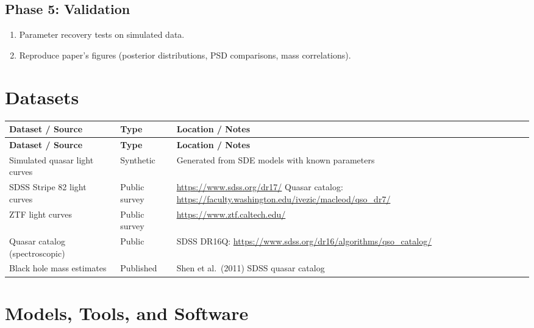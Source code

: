 \documentclass[11pt,a4paper]{article}
\begin{document}
\subsection{Phase 5: Validation}
\begin{enumerate}[label=\textbf{5.\arabic*}]
  \item Parameter recovery tests on simulated data.
  \item Reproduce paper's figures (posterior distributions, PSD comparisons, mass correlations).
\end{enumerate}

\section{Datasets}

\begin{longtable}{p{4.5cm} p{3.5cm} p{6cm}}
\toprule
\textbf{Dataset / Source} & \textbf{Type} & \textbf{Location / Notes} \\
\midrule
\endfirsthead
\toprule
\textbf{Dataset / Source} & \textbf{Type} & \textbf{Location / Notes} \\
\midrule
\endhead
Simulated quasar light curves & Synthetic & Generated from SDE models with known parameters \\
\midrule
SDSS Stripe 82 light curves & Public survey & \url{https://www.sdss.org/dr17/} \newline Quasar catalog: \url{https://faculty.washington.edu/ivezic/macleod/qso_dr7/} \\
\midrule
ZTF light curves & Public survey & \url{https://www.ztf.caltech.edu/} \\
\midrule
Quasar catalog (spectroscopic) & Public & SDSS DR16Q: \url{https://www.sdss.org/dr16/algorithms/qso_catalog/} \\
\midrule
Black hole mass estimates & Published & Shen et al.\ (2011) SDSS quasar catalog \\
\bottomrule
\end{longtable}

\section{Models, Tools, and Software}
\end{document}
